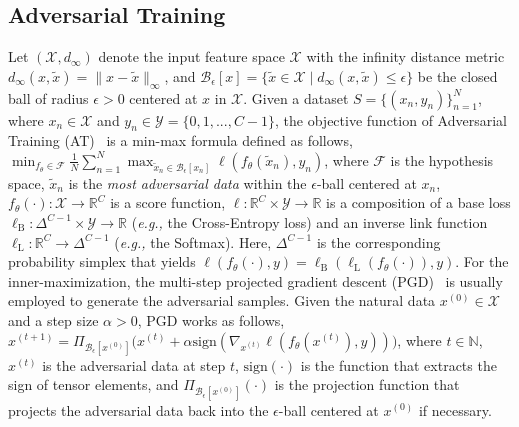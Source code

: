 \documentclass{article} %
\newcommand{\bR}{\mathbb{R}}
\newcommand{\cF}{\mathcal{F}}
\newcommand{\cX}{\mathcal{X}}
\newcommand{\cY}{\mathcal{Y}}
\newcommand{\bx}{{x}}
\newcommand{\bxtidle}{\tilde{{x}}}
\newcommand{\epsball}{\mathcal{B}_\epsilon}
\newcommand{\xadv}{\tilde{{x}}}
\theoremstyle{plain}
\theoremstyle{definition}
\theoremstyle{remark}
\begin{document}
\subsection{Adversarial Training}
Let $(\cX,d_\infty)$ denote the input feature space $\cX$ with the infinity distance metric $d_{\infty}(\bx,\xadv)=\|\bx-\xadv\|_\infty$, and $\epsball[\bx] = \{\xadv \in \cX \mid d_{\infty}(\bx,\xadv)\le\epsilon\}$
be the closed ball of radius $\epsilon>0$ centered at $\bx$ in $\cX$. Given a
dataset $S = \{ ({x}_n, y_n)\}^N_{n=1}$, where ${x}_n \in \cX$ and $y_n \in \cY =  \{0, 1, ..., C-1\}$, the objective function of Adversarial Training (AT)~\citep{Madry_adversarial_training} is a min-max formula defined as follows, $\min_{f_{\theta}\in\cF} \frac{1}{N}\sum_{n=1}^N \max_{\xadv_n\in\epsball[\bx_n]} \ell(f_{\theta}(\xadv_n),y_n)$,
where $\cF$ is the hypothesis space, $\bxtidle_n$ is the \textit{most adversarial data} within the $\epsilon$-ball centered at ${x_n}$, $f_{\theta}(\cdot):\cX\to\bR^C$ is a score function, $\ell:\bR^C\times\cY\to\bR$ is a composition of a base loss $\ell_\textrm{B}:\Delta^{C-1}\times\cY\to\bR$ (\textit{e.g.,} the Cross-Entropy loss) and an inverse link function $\ell_\textrm{L}:\bR^C\to\Delta^{C-1}$ (\textit{e.g.,} the Softmax). Here, $\Delta^{C-1}$ is the corresponding probability simplex that yields $\ell(f_{\theta}(\cdot),y)=\ell_\textrm{B}(\ell_\textrm{L}(f_{\theta}(\cdot)),y)$. 
For the inner-maximization, the multi-step projected gradient descent (PGD)~\citep{Madry_adversarial_training} is usually employed to generate the adversarial samples. Given the natural data ${x}^{(0)} \in \cX$ and a step size $\alpha > 0$, PGD works as follows,
${x}^{(t+1)} = \Pi_{\epsball[{x}^{(0)}]} \big( {x}^{(t)} +\alpha \text{sign} (\nabla_{{x}^{(t)}} \ell(f_{\theta}({x}^{(t)}), y )  )  \big )$,
where $t \in \mathbb{N}$, ${x}^{(t)}$ is the adversarial data at step $t$, $\text{sign}(\cdot)$ is the function that extracts the sign of tensor elements, and $\Pi_{\epsball[{x}^{(0)}]}(\cdot)$ is the projection function that projects the adversarial data back into the $\epsilon$-ball centered at ${x}^{(0)}$ if necessary.
\end{document}
